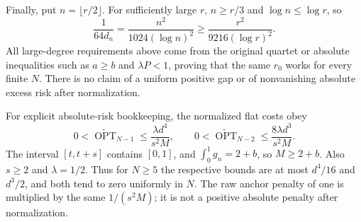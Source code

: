 Finally, put $n=\lfloor r/2\rfloor$. For sufficiently large $r$,
$n\ge r/3$ and $\log n\le\log r$, so
\[
 \frac1{64d_n}
 =\frac{n^2}{1024(\log n)^2}
 \ge\frac{r^2}{9216(\log r)^2}.
\]
All large-degree requirements above come from the original quartet or
absolute inequalities such as $a\ge b$ and $\lambda P<1$, proving
that the same $r_0$ works for every finite $N$. There is no claim of
a uniform positive gap or of nonvanishing absolute excess risk after
normalization.

For explicit absolute-risk bookkeeping, the normalized flat costs obey
\[
 0<\widetilde{\operatorname{OPT}}_{N-1}
 \le\frac{\lambda d^4}{s^2M},\qquad
 0<\widetilde{\operatorname{OPT}}_{N-2}
 \le\frac{8\lambda d^3}{s^2M}.
\]
The interval $[t,t+s]$ contains $[0,1]$, and
$\int_0^1g_n=2+b$, so $M\ge2+b$. Also $s\ge2$ and
$\lambda=1/2$. Thus for $N\ge5$ the respective bounds are at most
$d^4/16$ and $d^3/2$, and both tend to zero uniformly in $N$.
The raw anchor penalty of one is multiplied by the same
$1/(s^2M)$; it is not a positive absolute penalty after normalization.
